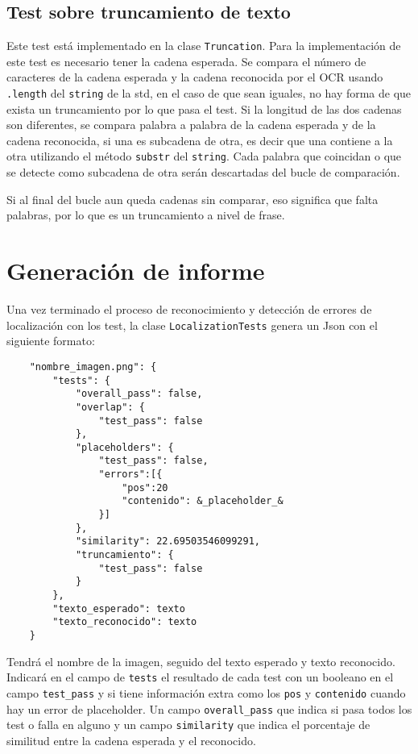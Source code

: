 \subsection{Test sobre truncamiento de texto}
\label{itest:truncamiento}
Este test está implementado en la clase \texttt{Truncation}.
Para la implementación de este test es necesario tener la cadena esperada. Se compara el número de caracteres de la cadena esperada y la cadena reconocida por el OCR usando \texttt{.length} del \texttt{string} de la std, en el caso de que sean iguales, no hay forma de que exista un truncamiento por lo que pasa el test.
Si la longitud de las dos cadenas son diferentes, se compara palabra a palabra de la cadena esperada y de la cadena reconocida, si una es subcadena de otra, es decir que una contiene a la otra utilizando el método \texttt{substr} del \texttt{string}. Cada palabra que coincidan o que se detecte como subcadena de otra serán descartadas del bucle de comparación.

Si al final del bucle aun queda cadenas sin comparar, eso significa que falta palabras, por lo que es un truncamiento a nivel de frase.
\section{Generación de informe}
\label{sec:Generación informe}
Una vez terminado el proceso de reconocimiento y detección de errores de localización con los test, la clase \texttt{LocalizationTests} genera un Json con el siguiente formato:
\begin{verbatim}
	"nombre_imagen.png": {
		"tests": {
			"overall_pass": false,
			"overlap": {
				"test_pass": false
			},
			"placeholders": {
				"test_pass": false,
				"errors":[{
					"pos":20
					"contenido": &_placeholder_&
				}]
			},
			"similarity": 22.69503546099291,
			"truncamiento": {
				"test_pass": false
			}
		},
		"texto_esperado": texto
		"texto_reconocido": texto
	}
\end{verbatim}
Tendrá el nombre de la imagen, seguido del texto esperado y texto reconocido. Indicará en el campo de \texttt{tests} el resultado de cada test con un booleano en el campo \texttt{test\_pass} y si tiene información extra como los \texttt{pos} y \texttt{contenido} cuando hay un error de placeholder. Un campo \texttt{overall\_pass} que indica si pasa todos los test o falla en alguno y un campo \texttt{similarity} que indica el porcentaje de similitud entre la cadena esperada y el reconocido.

